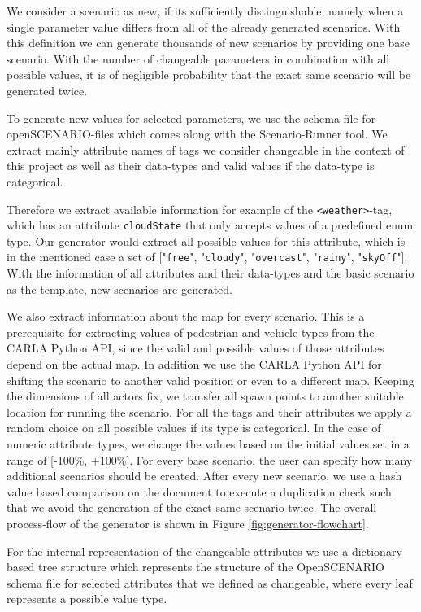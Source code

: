 \documentclass[conference, a4paper, 11pt]{IEEEtran}
\begin{document}
We consider a scenario as new, if its sufficiently distinguishable, namely when a single parameter value differs from all of the already generated scenarios. With this definition we can generate thousands of new scenarios by providing one base scenario. With the number of changeable parameters in combination with all possible values, it is of negligible probability that the exact same scenario will be generated twice.

To generate new values for selected parameters, we use the schema file for openSCENARIO-files which comes along with the Scenario-Runner tool. We extract mainly attribute names of tags we consider changeable in the context of this project as well as their data-types and valid values if the data-type is categorical.

 Therefore we extract available information for example of the \texttt{<weather>}-tag, which has an attribute \texttt{cloudState} that only accepts values of a predefined enum type. Our generator would extract all possible values for this attribute,  which is in the mentioned case a set of ["\texttt{free}", "\texttt{cloudy}", "\texttt{overcast}", "\texttt{rainy}", "\texttt{skyOff}"]. With the information of all attributes and their data-types and the basic scenario as the template, new scenarios are generated. 
 
 We also extract information about the map for every scenario. This is a prerequisite for extracting values of pedestrian and vehicle types from the CARLA Python API, since the valid and possible values of those attributes depend on the actual map. In addition we use the CARLA Python API for shifting the scenario to another valid position or even to a different map. Keeping the dimensions of all actors fix, we transfer all spawn points to another suitable location for running the scenario.
 For all the tags and their attributes we apply a random choice on all possible values if its type is categorical. In the case of numeric attribute types, we change the values based on the initial values set in a range of [-100\%, +100\%].
 For every base scenario, the user can specify how many additional scenarios should be created. After every new scenario, we use a hash value based comparison on the document to execute a duplication check such that we avoid the generation of the exact same scenario twice.
The overall process-flow of the generator is shown in Figure \ref{fig:generator-flowchart}.

For the internal representation of the changeable attributes we use a dictionary based tree structure which represents the structure of the OpenSCENARIO schema file for selected attributes that we defined as changeable, where every leaf represents a possible value type.
\end{document}
